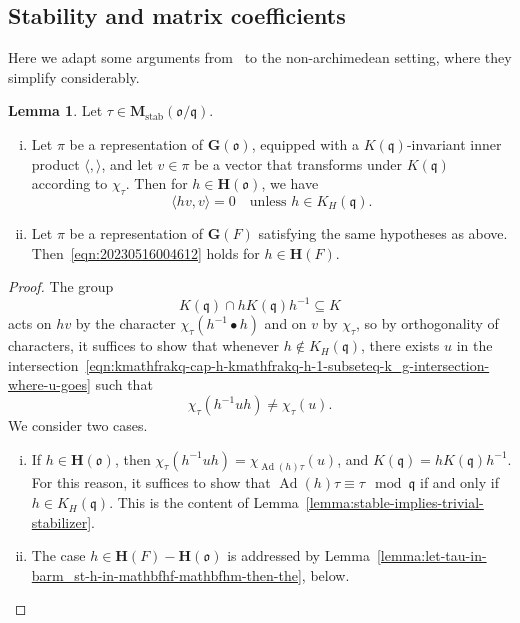 \documentclass[reqno]{amsart}
\DeclareMathOperator{\Ad}{Ad}
\DeclareMathOperator{\stab}{stab}
\theoremstyle{plain} \newtheorem{theorem} {Theorem} \newtheorem{conjecture} {Conjecture} \newtheorem{corollary} [theorem] {Corollary} \newtheorem{proposition} [theorem] {Proposition} \newtheorem{fact} [theorem] {Fact}
\theoremstyle{definition} \newtheorem{definition} [theorem] {Definition}
\theoremstyle{itplain} %
\newtheorem{lemma}[theorem]{Lemma}
\newcommand{\mfq}{\mathfrak{q}}
\begin{document}
\subsection{Stability and matrix coefficients}\label{sec:20230517161735}
Here we adapt some arguments from~\cite[\S19]{nelson-venkatesh-1} to the non-archimedean setting, where they simplify considerably.

\begin{lemma}\label{lemma:matrix-coefficients-and-stability-one-rep}
  Let $\tau \in \mathbf{M}_{\stab}(\mathfrak{o}/\mfq)$.
  \begin{enumerate}[(i)]
  \item\label{enumerate:cj3twlzoes} Let $\pi$ be a representation of $\mathbf{G}(\mathfrak{o})$, equipped with a $K(\mfq)$-invariant inner product $\langle , \rangle$, and let $v \in \pi$ be a vector that transforms under $K(\mfq)$ according to $\chi_\tau$.  Then for $h \in \mathbf{H}(\mathfrak{o})$, we have
    \begin{equation}\label{eqn:20230516004612}
      \langle h v, v \rangle = 0 \quad \text{unless } h \in K_H(\mfq).
    \end{equation}
  \item\label{enumerate:cj3twlzxgy} Let $\pi$ be a representation of $\mathbf{G}(F)$ satisfying the same hypotheses as above.  Then~\eqref{eqn:20230516004612} holds for $h \in \mathbf{H}(F)$.
  \end{enumerate}
\end{lemma}
\begin{proof}
  The group
  \begin{equation}\label{eqn:kmathfrakq-cap-h-kmathfrakq-h-1-subseteq-k_g-intersection-where-u-goes}
    K(\mfq) \cap h K(\mfq) h^{-1} \subseteq K
  \end{equation}
  acts on $h v$ by the character $\chi_\tau(h^{-1} \bullet h)$ and on $v$ by $\chi_\tau$, so by orthogonality of characters, it suffices to show that whenever $h \notin K_H(\mfq)$, there exists $u$ in the intersection~\eqref{eqn:kmathfrakq-cap-h-kmathfrakq-h-1-subseteq-k_g-intersection-where-u-goes} such that
  \begin{equation*}
    \chi_\tau (h ^{-1} u h) \neq \chi _\tau (u).
  \end{equation*}
  We consider two cases.
  \begin{enumerate}[(i)]
  \item If $h \in \mathbf{H}(\mathfrak{o})$, then $\chi_\tau(h ^{-1} u h) = \chi_{\Ad(h) \tau}(u)$, and $K(\mfq) = h K(\mfq) h^{-1}$. For this reason, it suffices to show that $\Ad(h) \tau \equiv \tau \mod\mfq$ if and only if $h \in K_H(\mfq)$.  This is the content of Lemma~\ref{lemma:stable-implies-trivial-stabilizer}.
  \item The case $h \in \mathbf{H}(F) - \mathbf{H}(\mathfrak{o})$ is addressed by Lemma~\ref{lemma:let-tau-in-barm_st-h-in-mathbfhf-mathbfhm-then-the}, below.
  \end{enumerate}
\end{proof}
\end{document}
